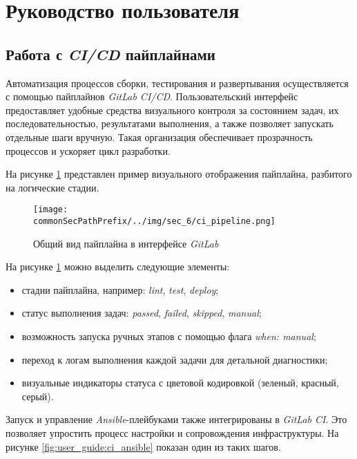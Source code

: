 \section{Руководство пользователя}

\subsection{Работа с \textit{CI/CD} пайплайнами}

Автоматизация процессов сборки, тестирования и развертывания осуществляется с помощью пайплайнов \textit{GitLab CI/CD}. Пользовательский интерфейс предоставляет удобные средства визуального контроля за состоянием задач, их последовательностью, результатами выполнения, а также позволяет запускать отдельные шаги вручную. Такая организация обеспечивает прозрачность процессов и ускоряет цикл разработки.

На рисунке \ref{fig:user_guide:ci_pipeline} представлен пример визуального отображения пайплайна, разбитого на логические стадии. 

\begin{figure}[ht]
    \centering
    \texttt{[image: \\commonSecPathPrefix/../img/sec\_6/ci\_pipeline.png]}
    \caption{Общий вид пайплайна в интерфейсе \textit{GitLab}}
    \label{fig:user_guide:ci_pipeline}
\end{figure}

На рисунке \ref{fig:user_guide:ci_pipeline} можно выделить следующие элементы:
\begin{itemize}
    \item стадии пайплайна, например: \textit{lint}, \textit{test}, \textit{deploy};
    \item статус выполнения задач: \textit{passed}, \textit{failed}, \textit{skipped}, \textit{manual};
    \item возможность запуска ручных этапов с помощью флага \textit{when: manual};
    \item переход к логам выполнения каждой задачи для детальной диагностики;
    \item визуальные индикаторы статуса с цветовой кодировкой (зеленый, красный, серый).
\end{itemize}

Запуск и управление \textit{Ansible}-плейбуками также интегрированы в \textit{GitLab CI}. Это позволяет упростить процесс настройки и сопровождения инфраструктуры. На рисунке \ref{fig:user_guide:ci_ansible} показан один из таких шагов.

